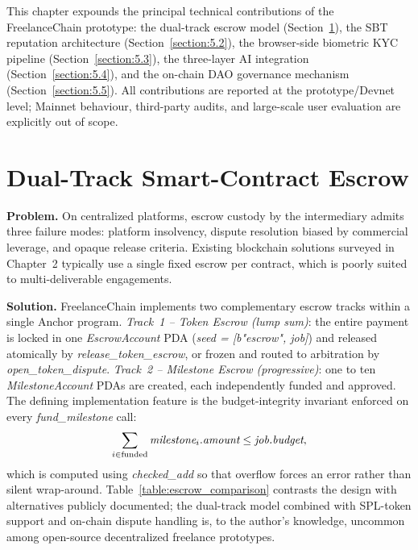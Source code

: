 This chapter expounds the principal technical contributions of the FreelanceChain prototype: the dual-track escrow model (Section~\ref{section:5.1}), the SBT reputation architecture (Section~\ref{section:5.2}), the browser-side biometric KYC pipeline (Section~\ref{section:5.3}), the three-layer AI integration (Section~\ref{section:5.4}), and the on-chain DAO governance mechanism (Section~\ref{section:5.5}). All contributions are reported at the prototype/Devnet level; Mainnet behaviour, third-party audits, and large-scale user evaluation are explicitly out of scope.

\section{Dual-Track Smart-Contract Escrow}
\label{section:5.1}

\textbf{Problem.} On centralized platforms, escrow custody by the intermediary admits three failure modes: platform insolvency, dispute resolution biased by commercial leverage, and opaque release criteria. Existing blockchain solutions surveyed in Chapter~2 typically use a single fixed escrow per contract, which is poorly suited to multi-deliverable engagements.

\textbf{Solution.} FreelanceChain implements two complementary escrow tracks within a single Anchor program. \emph{Track~1 -- Token Escrow (lump sum)}: the entire payment is locked in one \emph{EscrowAccount} PDA (\emph{seed = [b"escrow", job]}) and released atomically by \emph{release\_token\_escrow}, or frozen and routed to arbitration by \emph{open\_token\_dispute}. \emph{Track~2 -- Milestone Escrow (progressive)}: one to ten \emph{MilestoneAccount} PDAs are created, each independently funded and approved. The defining implementation feature is the budget-integrity invariant enforced on every \emph{fund\_milestone} call:
\[
\sum_{i \in \text{funded}} \emph{milestone}_i.\emph{amount} \le \emph{job.budget},
\]
\noindent which is computed using \emph{checked\_add} so that overflow forces an error rather than silent wrap-around. Table~\ref{table:escrow_comparison} contrasts the design with alternatives publicly documented; the dual-track model combined with SPL-token support and on-chain dispute handling is, to the author's knowledge, uncommon among open-source decentralized freelance prototypes.

